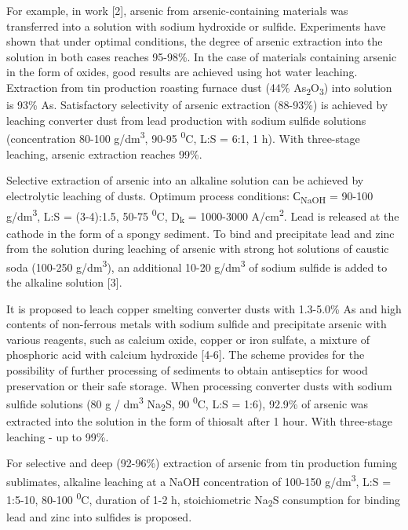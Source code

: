 For example, in work {[}2{]}, arsenic from arsenic-containing materials
was transferred into a solution with sodium hydroxide or sulfide.
Experiments have shown that under optimal conditions, the degree of
arsenic extraction into the solution in both cases reaches 95-98\%. In
the case of materials containing arsenic in the form of oxides, good
results are achieved using hot water leaching. Extraction from tin
production roasting furnace dust (44\%
As\textsubscript{2}O\textsubscript{3}) into solution is 93\% As.
Satisfactory selectivity of arsenic extraction (88-93\%) is achieved by
leaching converter dust from lead production with sodium sulfide
solutions (concentration 80-100 g/dm\textsuperscript{3}, 90-95
\textsuperscript{0}C, L:S = 6:1, 1 h). With three-stage leaching,
arsenic extraction reaches 99\%.

Selective extraction of arsenic into an alkaline solution can be
achieved by electrolytic leaching of dusts. Optimum process conditions:
С\textsubscript{NaOH} = 90-100 g/dm\textsuperscript{3}, L:S = (3-4):1.5,
50-75 \textsuperscript{0}C, D\textsubscript{k} = 1000-3000
A/cm\textsuperscript{2}. Lead is released at the cathode in the form of
a spongy sediment. To bind and precipitate lead and zinc from the
solution during leaching of arsenic with strong hot solutions of caustic
soda (100-250 g/dm\textsuperscript{3}), an additional 10-20
g/dm\textsuperscript{3} of sodium sulfide is added to the alkaline
solution {[}3{]}.

It is proposed to leach copper smelting converter dusts with 1.3-5.0\%
As and high contents of non-ferrous metals with sodium sulfide and
precipitate arsenic with various reagents, such as calcium oxide, copper
or iron sulfate, a mixture of phosphoric acid with calcium hydroxide
{[}4-6{]}. The scheme provides for the possibility of further processing
of sediments to obtain antiseptics for wood preservation or their safe
storage. When processing converter dusts with sodium sulfide solutions
(80 g / dm\textsuperscript{3} Na\textsubscript{2}S, 90
\textsuperscript{0}C, L:S = 1:6), 92.9\% of arsenic was extracted into
the solution in the form of thiosalt after 1 hour. With three-stage
leaching - up to 99\%.

For selective and deep (92-96\%) extraction of arsenic from tin
production fuming sublimates, alkaline leaching at a NaOH concentration
of 100-150 g/dm\textsuperscript{3}, L:S = 1:5-10, 80-100
\textsuperscript{0}C, duration of 1-2 h, stoichiometric
Na\textsubscript{2}S consumption for binding lead and zinc into sulfides
is proposed.

